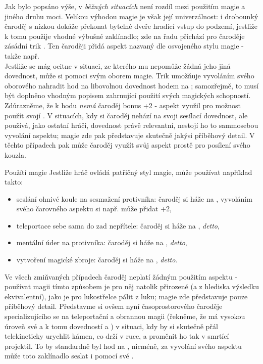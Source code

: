 \documentclass[../main.tex]{subfiles}
\begin{document}
Jak bylo popsáno výše, v \emph{běžných situacích} není rozdíl mezi použitím magie a jiného druhu moci. Velikou výhodou magie je však její univerzálnost: i drobounký čaroděj s nízkou  dokáže překonat bytelné dveře hradící vstup do podzemí, jestliže k tomu použije vhodné výbušné zaklínadlo; zde na řadu přichází pro čaroděje zásádní trik . Ten čaroději přidá aspekt nazvaný dle osvojeného stylu magie - takže např. \\
Jestliže se mág ocitne v situaci, ze kterého mu nepomůže žádná jeho jiná dovednost, může si pomoci svým oborem magie. Trik  umožňuje vyvoláním svého oborového nahradit hod na libovolnou dovednost hodem na ; samozřejmě, to musí být doplněno vhodným popisem zahrnující použití svých magických schopností. Zdůrazněme, že k hodu \emph{nemá} čaroděj bonus +2 - aspekt využil pro možnost použít svojí . V situacích, kdy si čaroděj nehází na svoji sesílací dovednost, ale používá, jako ostatní hráči, dovednost právě relevantní, nestojí ho to sammosebou vyvolání aspektu; magie zde pak představuje skutečně jakýsi příběhový detail. V těchto případech pak může čaroděj využít svůj aspekt prostě pro posílení svého kouzla.\\

\begin{example}{Použítí magie}
	Jestliže hráč ovládá patřičný styl magie, může používat například takto:
  \begin{itemize}
	  \item seslání ohnivé koule na sesmažení protivníka: čaroděj si háže na , vyvoláním svého čarovného aspektu si např. může přidat +2,
	  \item teleportace sebe sama do zad nepřítele: čaroděj si háže na , \emph{detto},
	  \item mentální úder na protivníka: čaroděj si háže na , \emph{detto},
	  \item vytvoření magické zbroje: čaroděj si háže na , \emph{detto}.
  \end{itemize}
  Ve všech zmiňvaných případech čaroděj neplatí žádným použitím aspektu - používat magii tímto způsobem je pro něj natolik přirozené (a z hlediska výsledku ekvivalentní), jako je pro lukostřelce pálit z luku; magie zde představuje pouze příběhový detail. Představme si ovšem nyní časoprostorového čaroděje specializujícího se na teleportační a obrannou magii (řekněme, že má vysokou úroveň své  a k tomu dovedností  a ) v situaci, kdy by si skutečně přál telekineticky urychlit kámen, co drží v ruce, a proměnit ho tak v smrtící projektil. To by standardně byl hod na  , nicméně, za vyvolání svého aspektu může toto zaklínadlo seslat i pomocí své . 
\end{example}
\end{document}
